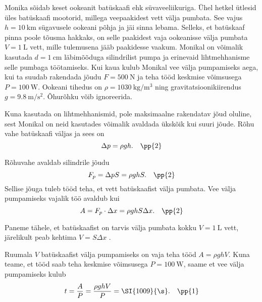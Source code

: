
Monika sõidab keset ookeanit batüskaafi ehk süvaveeliikuriga. Ühel hetkel
ütlesid üles batüskaafi mootorid, millega veepaakidest vett välja pumbata. See
vajus $h=\SI{10}{\kilo\meter}$ sügavusele ookeani põhja ja jäi sinna lebama.
Selleks, et batüskaaf pinna poole tõusma hakkaks, on selle paakidest vaja ookeanisse
välja pumbata $V=\SI{1}{\liter}$ vett, mille tulemusena jääb paakidesse vaakum.
Monikal on võimalik kasutada $d=\SI{1}{\centi\meter}$ läbimõõduga silindrilist
pumpa ja erinevaid lihtmehhanisme selle pumbaga töötamiseks. Kui kaua kulub Monikal
vee välja pumpamiseks aega, kui ta suudab rakendada jõudu $F=\SI{500}{\newton}$
ja teha tööd keskmise võimsusega $P=\SI{100}{\watt}$. Ookeani tihedus on
$\rho=\SI{1030}{\kilo\gram\per\meter\cubed}$ ning gravitatsioonikiirendus
$g=\SI{9.8}{\meter\per\second\squared}$. Õhurõhku võib ignoreerida.


\hint

\solu
Kuna kasutada on lihtmehhanismid, pole maksimaalne rakendatav jõud oluline, sest Monikal on neid kasutades võimalik avaldada ükskõik kui suuri jõude. Rõhu vahe batüskaafi väljas ja sees on
$$\Delta p=\rho gh. \quad \pp{2}$$

Rõhuvahe avaldab silindrile jõudu
$$F_p=\Delta p S = \rho gh S. \quad \pp{2}$$
Sellise jõuga tuleb tööd teha, et vett batüskaafist välja pumbata. Vee välja pumpamiseks vajalik töö avaldub kui
$$A=F_p\cdot \Delta x= \rho gh S \Delta x. \quad \pp{2}$$

Paneme tähele, et batüskaafist on tarvis välja pumbata kokku $V=\SI{1}{\liter}$ vett, järelikult peab kehtima $V=S\Delta x$ .

Ruumala $V$ batüskaafist välja pumpamiseks on vaja teha tööd $A=\rho g h V$. Kuna teame, et tööd saab teha keskmise võimsusega $P=\SI{100}{\W}$, saame et vee välja pumpamiseks kulub
$$t=\frac{A}{P}=\frac{\rho g h V}{P}=\SI{1009}{\s}. \quad \pp{1}$$
\probend